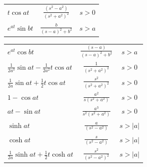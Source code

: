 \documentclass[12pt]{report}
\begin{document}
\begin{center}
\begin{tabular}{llcccc}
		\multicolumn{2}{l}{$\displaystyle t \cos at$} & \multicolumn{2}{c}{$\displaystyle \frac{(s^2 - a^2)}{(s^2 + a^2)^2}$} & \multicolumn{2}{c}{$s > 0$} \\


		\multicolumn{2}{l}{$\displaystyle e^{at} \sin bt$} & \multicolumn{2}{c}{$\displaystyle \frac{b}{(s - a)^2 + b^2}$} & \multicolumn{2}{c}{$s > a$} \\


\end{tabular}


\renewcommand{\arraystretch}{1.7}
	\renewcommand{\tabcolsep}{9mm}
	\begin{tabular}{llcccc}

		\multicolumn{2}{l}{$\displaystyle e^{at} \cos bt$} & \multicolumn{2}{c}{$\displaystyle \frac{(s-a)}{(s - a)^2 + b^2}$} & \multicolumn{2}{c}{$s > a$} \\

		
		\multicolumn{2}{l}{$\displaystyle \frac{1}{2a^3} \sin at - \frac{1}{2a^2} t \cos at$} & \multicolumn{2}{c}{$\displaystyle \frac{1}{(s^2 + a^2)^2 }$} & \multicolumn{2}{c}{$s > 0$} \\

		\multicolumn{2}{l}{$\displaystyle \frac{1}{2a} \sin at + \frac{1}{2} t \cos at$} & \multicolumn{2}{c}{$\displaystyle \frac{s^2}{(s^2 + a^2)^2 }$} & \multicolumn{2}{c}{$s > 0$} \\
		\multicolumn{2}{l}{$\displaystyle 1 - \cos at$} & \multicolumn{2}{c}{$\displaystyle \frac{a^2}{s(s^2 + a^2) }$} & \multicolumn{2}{c}{$s > 0$} \\

		\multicolumn{2}{l}{$\displaystyle at - \sin at$} & \multicolumn{2}{c}{$\displaystyle \frac{a^3}{s^{2}(s^2 + a^2) }$} & \multicolumn{2}{c}{$s > 0$} \\

		\multicolumn{2}{l}{$\displaystyle \sinh at $} & \multicolumn{2}{c}{$\displaystyle \frac{a}{(s^2 - a^2) }$} & \multicolumn{2}{c}{$s > |a|$} \\
		
		\multicolumn{2}{l}{$\displaystyle \cosh at $} & \multicolumn{2}{c}{$\displaystyle \frac{s}{(s^2 - a^2) }$} & \multicolumn{2}{c}{$s > |a|$} \\
		

		\multicolumn{2}{l}{$\displaystyle \frac{1}{2a} \sinh at + \frac{1}{2} t \cosh at$} & \multicolumn{2}{c}{$\displaystyle \frac{s^2}{(s^2 - a^2)^2 }$} & \multicolumn{2}{c}{$s > |a|$} \\


\end{tabular}
\end{center}
\end{document}
